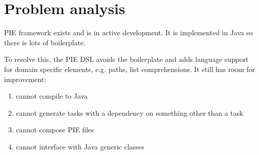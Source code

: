 
\chapter{\label{chap:problem_analysis}Problem analysis}

PIE framework exists and is in active development.
It is implemented in Java so there is lots of boilerplate.

To resolve this, the PIE DSL avoids the boilerplate and adds language support for domain specific elements, e.g. paths, list comprehensions.
It still has room for improvement:
\begin{enumerate}
  \item cannot compile to Java
  \item cannot generate tasks with a dependency on something other than a task
  \item cannot compose PIE files
  \item cannot interface with Java generic classes
\end{enumerate}
